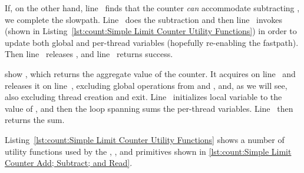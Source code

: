 \begin{fcvref}
If, on the other hand, line~ finds that the counter \emph{can}
accommodate subtracting , we complete the slowpath.
Line~ does the subtraction and then
line~ invokes  (shown in
Listing~\ref{lst:count:Simple Limit Counter Utility Functions})
in order to update both global and per-thread variables
(hopefully re-enabling the fastpath).
Then line~ releases , and
line~ returns success.
\end{fcvref}

\QuickQuizEnd

\begin{fcvref}
 show ,
which returns the aggregate value
of the counter.
It acquires  on line~
and releases it on line~,
excluding global operations from  and ,
and, as we will see, also excluding thread creation and exit.
Line~ initializes local variable  to the value of
, and then the loop spanning
 sums the
per-thread  variables.
Line~ then returns the sum.
\end{fcvref}

\begin{listing}[tbp]

\caption{Simple Limit Counter Utility Functions}
\label{lst:count:Simple Limit Counter Utility Functions}
\end{listing}

Listing~\ref{lst:count:Simple Limit Counter Utility Functions}
shows a number of utility functions used by the ,
, and  primitives shown in
\cref{lst:count:Simple Limit Counter Add; Subtract; and Read}.

